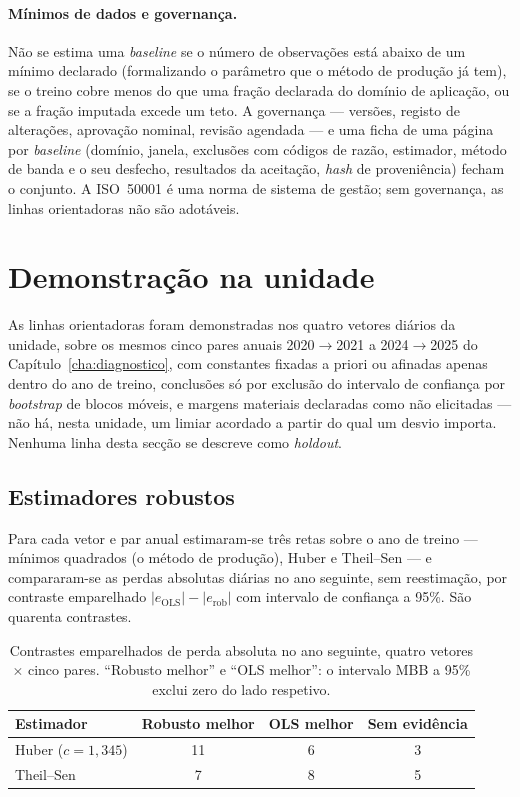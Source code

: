 \paragraph{Mínimos de dados e governança.} Não se estima uma \emph{baseline}
se o número de observações está abaixo de um mínimo declarado (formalizando
o parâmetro que o método de produção já tem), se o treino cobre menos do que
uma fração declarada do domínio de aplicação, ou se a fração imputada excede
um teto. A governança --- versões, registo de alterações, aprovação nominal,
revisão agendada --- e uma ficha de uma página por \emph{baseline} (domínio,
janela, exclusões com códigos de razão, estimador, método de banda e o seu
desfecho, resultados da aceitação, \emph{hash} de proveniência) fecham o
conjunto. A ISO~50001 é uma norma de sistema de gestão; sem governança, as
linhas orientadoras não são adotáveis.

\section{Demonstração na unidade}
\label{sec:demonstracao}

As linhas orientadoras foram demonstradas nos quatro vetores diários da
unidade, sobre os mesmos cinco pares anuais 2020${\to}$2021 a
2024${\to}$2025 do Capítulo~\ref{cha:diagnostico}, com constantes fixadas a
priori ou afinadas apenas dentro do ano de treino, conclusões só por
exclusão do intervalo de confiança por \emph{bootstrap} de blocos móveis, e
margens materiais declaradas como não elicitadas --- não há, nesta unidade,
um limiar acordado a partir do qual um desvio importa. Nenhuma linha desta
secção se descreve como \emph{holdout}.

\subsection{Estimadores robustos}
\label{sec:demo-robustos}

Para cada vetor e par anual estimaram-se três retas sobre o ano de treino
--- mínimos quadrados (o método de produção), Huber e Theil--Sen --- e
compararam-se as perdas absolutas diárias no ano seguinte, sem reestimação,
por contraste emparelhado $|e_{\mathrm{OLS}}| - |e_{\mathrm{rob}}|$ com
intervalo de confiança a 95\%. São quarenta contrastes.

\begin{table}[htbp]
  \centering
  \caption[Estimadores robustos contra mínimos quadrados]{Contrastes
  emparelhados de perda absoluta no ano seguinte, quatro vetores $\times$
  cinco pares. ``Robusto melhor'' e ``OLS melhor'': o intervalo MBB a 95\%
  exclui zero do lado respetivo.}
  \label{tab:robustos}
  \begin{tabular}{lccc}
    \toprule
    Estimador & Robusto melhor & OLS melhor & Sem evidência \\
    \midrule
    Huber ($c = 1{,}345$) & 11 & 6 & 3 \\
    Theil--Sen            & 7  & 8 & 5 \\
    \bottomrule
  \end{tabular}
\end{table}

